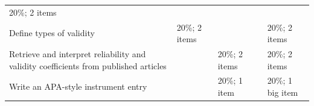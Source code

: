 \documentclass[
  english,
]{book}
\begin{document}
\begin{longtable}[]{@{}lllll@{}}
\begin{minipage}[t]{0.17\columnwidth}
20\%; 2 items\strut
\end{minipage}\tabularnewline
\begin{minipage}[t]{0.37\columnwidth}\raggedright
Define types of validity\strut
\end{minipage} & \begin{minipage}[t]{0.11\columnwidth}\raggedright
20\%; 2 items\strut
\end{minipage} & \begin{minipage}[t]{0.10\columnwidth}\raggedright
\strut
\end{minipage} & \begin{minipage}[t]{0.10\columnwidth}\raggedright
\strut
\end{minipage} & \begin{minipage}[t]{0.17\columnwidth}\raggedright
20\%; 2 items\strut
\end{minipage}\tabularnewline
\begin{minipage}[t]{0.37\columnwidth}\raggedright
Retrieve and interpret reliability and validity coefficients from published articles\strut
\end{minipage} & \begin{minipage}[t]{0.11\columnwidth}\raggedright
\strut
\end{minipage} & \begin{minipage}[t]{0.10\columnwidth}\raggedright
20\%; 2 items\strut
\end{minipage} & \begin{minipage}[t]{0.10\columnwidth}\raggedright
\strut
\end{minipage} & \begin{minipage}[t]{0.17\columnwidth}\raggedright
20\%; 2 items\strut
\end{minipage}\tabularnewline
\begin{minipage}[t]{0.37\columnwidth}\raggedright
Write an APA-style instrument entry\strut
\end{minipage} & \begin{minipage}[t]{0.11\columnwidth}\raggedright
\strut
\end{minipage} & \begin{minipage}[t]{0.10\columnwidth}\raggedright
20\%; 1 item\strut
\end{minipage} & \begin{minipage}[t]{0.10\columnwidth}\raggedright
\strut
\end{minipage} & \begin{minipage}[t]{0.17\columnwidth}\raggedright
20\%; 1 big item\strut
\end{minipage}\tabularnewline

\end{longtable}
\end{document}
